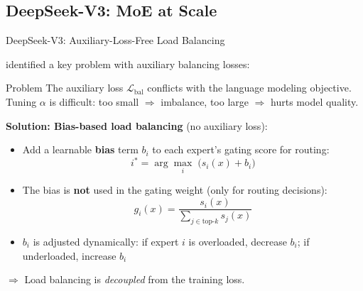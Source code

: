 \subsection{DeepSeek-V3: MoE at Scale}

\begin{frame}{DeepSeek-V3: Auxiliary-Loss-Free Load Balancing}

  \cite{deepseekai2024deepseekv3} identified a key problem with auxiliary balancing losses:

  \vspace{0.3em}
  \begin{alertblock}{Problem}
    The auxiliary loss $\mathcal{L}_{\text{bal}}$ conflicts with the language modeling objective. Tuning $\alpha$ is difficult: too small $\Rightarrow$ imbalance, too large $\Rightarrow$ hurts model quality.
  \end{alertblock}

  \vspace{0.3em}
  \textbf{Solution: Bias-based load balancing} (no auxiliary loss):

  \begin{itemize}
    \item Add a learnable \textbf{bias} term $b_i$ to each expert's gating score for routing:
    \[
      i^* = \arg\max_i \; \big(s_i(x) + b_i\big)
    \]
    \item The bias is \textbf{not} used in the gating weight (only for routing decisions):
    \[
      g_i(x) = \frac{s_i(x)}{\sum_{j \in \text{top-}k} s_j(x)}
    \]
    \item $b_i$ is adjusted dynamically: if expert $i$ is overloaded, decrease $b_i$; if underloaded, increase $b_i$
  \end{itemize}

  $\Rightarrow$ Load balancing is \emph{decoupled} from the training loss.
\end{frame}

